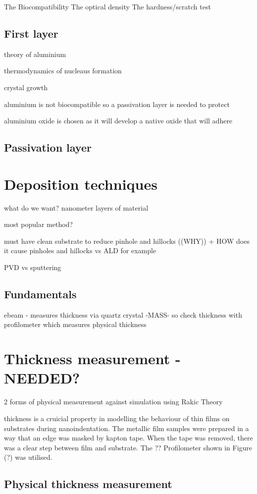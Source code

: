 \documentclass{article}
\begin{document}
The Biocompatibility
The optical density 
The hardness/scratch test

\subsection{First layer}
theory of aluminium 

thermodynamics of nucleaus formation

crystal growth 

aluminium is not biocompatible so a passivation layer is needed to protect 

aluminium oxide is chosen as it will develop a native oxide that will adhere 
\subsection{Passivation layer}

\section{Deposition techniques}

what do we want? nanometer layers of material 

most popular method?

must have clean substrate to reduce pinhole and hillocks ((WHY)) + HOW does it cause pinholes and hillocks vs ALD for example

PVD vs sputtering


\subsection{Fundamentals}
ebeam - measures thickness via quartz crystal -MASS- so check thickness with profilometer which measures physical thickness


\section{Thickness measurement - NEEDED?}

2 forms of physical measurement against simulation using Rakic Theory

thickness is a cruicial property in modelling the behaviour of thin films on substrates 
during nanoindentation. The metallic film samples were prepared in a way that an edge
was masked by kapton tape. When the tape was removed, there was a clear step between film and 
substrate. The ?? Profilometer shown in Figure (?) was utilised. 
\subsection{Physical thickness measurement}
\end{document}

